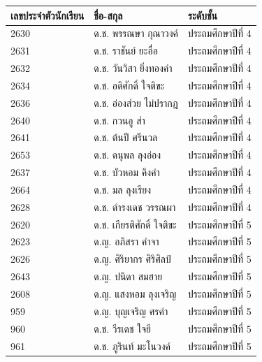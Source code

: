 \begin{table}[h]
    \begin{center}
        \begin{tabular}{ |p{3cm}|p{4cm}|p{3cm}| }
            \hline
            เลขประจำตัวนักเรียน & ชื่อ-สกุล & ระดับชั้น\\
            \hline\hline
            2630 & ด.ช. พรรณษา กุณาวงค์ & ประถมศึกษาปีที่ 4\\
            \hline
            2631 & ด.ช. ราชันย์ ยะอื่อ & ประถมศึกษาปีที่ 4\\
            \hline
            2632 & ด.ช. วันวิสา ยิ่งทองคำ & ประถมศึกษาปีที่ 4\\
            \hline
            2634 & ด.ช. อดิศักดิ์ ใจติขะ & ประถมศึกษาปีที่ 4\\
            \hline
            2636 & ด.ช. อ่องส่วย ไม่ปรากฎ & ประถมศึกษาปีที่ 4\\
            \hline
            2640 & ด.ช. กวนอู ส่า & ประถมศึกษาปีที่ 4\\
            \hline
            2641 & ด.ช. ต้นปี ศรีนวล & ประถมศึกษาปีที่ 4\\
            \hline
            2653 & ด.ช. ดนุพล ลุงอ่อง & ประถมศึกษาปีที่ 4\\
            \hline
            2637 & ด.ช. บัวหอม คิงคำ & ประถมศึกษาปีที่ 4\\
            \hline
            2664 & ด.ช. มล ลุงเรียง & ประถมศึกษาปีที่ 4\\
            \hline
            2628 & ด.ช. ดำรงเดช วรรณผา & ประถมศึกษาปีที่ 4\\
            \hline
            2620 & ด.ช. เกียรติศักดิ์ ใจติขะ & ประถมศึกษาปีที่ 5\\
            \hline
            2623 & ด.ญ. อภิสรา คำจา & ประถมศึกษาปีที่ 5\\
            \hline
            2626 & ด.ญ. ศิริยากร ศิริศิลป์ & ประถมศึกษาปีที่ 5\\
            \hline
            2643 & ด.ญ. ปนิดา สมฮาย & ประถมศึกษาปีที่ 5\\
            \hline
            2608 & ด.ญ. แสงหอม ลุงเจริญ & ประถมศึกษาปีที่ 5\\
            \hline
            959 & ด.ญ. บุญเจริญ ศรคำ & ประถมศึกษาปีที่ 5\\
            \hline
            960 & ด.ช. วีรเดช ใจยี & ประถมศึกษาปีที่ 5\\
            \hline
            961 & ด.ช. ภูรินท์ มะโนวงค์ & ประถมศึกษาปีที่ 5\\

\end{tabular}
\end{center}
\end{table}
